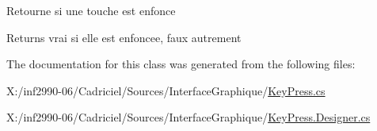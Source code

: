 Retourne si une touche est enfonce 

\begin{DoxyReturn}{Returns}
vrai si elle est enfoncee, faux autrement
\end{DoxyReturn}


The documentation for this class was generated from the following files\-:\begin{DoxyCompactItemize}
\item 
X\-:/inf2990-\/06/\-Cadriciel/\-Sources/\-Interface\-Graphique/\hyperlink{_key_press_8cs}{Key\-Press.\-cs}\item 
X\-:/inf2990-\/06/\-Cadriciel/\-Sources/\-Interface\-Graphique/\hyperlink{_key_press_8_designer_8cs}{Key\-Press.\-Designer.\-cs}\end{DoxyCompactItemize}
